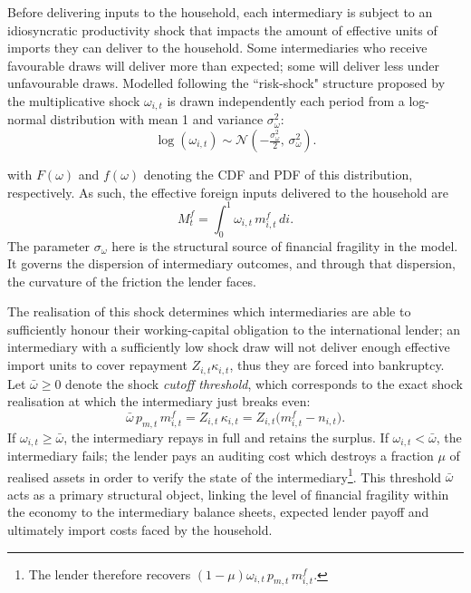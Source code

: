 \documentclass[11pt]{article}
\theoremstyle{definition}
\theoremstyle{plain}
\theoremstyle{remark}
\newcommand{\mf}{m^{f}}
\newcommand{\Mf}{M^{f}}
\begin{document}
Before delivering inputs to the household, each intermediary is subject to an idiosyncratic productivity shock that impacts the amount of effective units of imports they can deliver to the household. Some intermediaries who receive favourable draws will deliver more than expected; some will deliver less under unfavourable draws. Modelled following the ``risk-shock" structure proposed by \citet{christiano_risk_2014} the multiplicative shock $\omega_{i,t}$ is drawn independently each period from a log-normal distribution with mean 1 and variance $\sigma_\omega^2$:
\begin{equation}\label{eq:omega_dist}
\log(\omega_{i,t}) \sim \mathcal{N}\!\left(-\tfrac{\sigma_\omega^2}{2},\, \sigma_\omega^2\right).
\end{equation}

with $F(\omega)$ and $f(\omega)$ denoting the CDF and PDF of this distribution, respectively. As such, the effective foreign inputs delivered to the household are
\begin{equation}\label{eq:agg_supply}
\Mf_t = \int_0^1 \omega_{i,t}\,\mf_{i,t}\,di.
\end{equation}
The parameter $\sigma_\omega$ here is the structural source of financial fragility in the model. It governs the dispersion of intermediary outcomes, and through that dispersion, the curvature of the friction the lender faces. 

The realisation of this shock determines which intermediaries are able to sufficiently honour their working-capital obligation to the international lender; an intermediary with a sufficiently low shock draw will not deliver enough effective import units to cover repayment $Z_{i,t}\kappa_{i,t}$, thus they are forced into bankruptcy. Let $\bar{\omega}\geq 0$ denote the shock \textit{cutoff threshold}, which corresponds to the exact shock realisation at which the intermediary just breaks even:
\begin{equation}\label{eq:threshold}
\bar{\omega}\, p_{m,t}\, \mf_{i,t} = Z_{i,t}\,\kappa_{i,t} = Z_{i,t}\bigl( \mf_{i,t} - n_{i,t}\bigr).
\end{equation}
If $\omega_{i,t} \geq \bar{\omega}$, the intermediary repays in full and retains the surplus. If $\omega_{i,t} < \bar{\omega}$, the intermediary fails; the lender pays an auditing cost which destroys a fraction $\mu$ of realised assets in order to verify the state of the intermediary\footnote{The lender therefore recovers $(1-\mu)\omega_{i,t}\,p_{m,t}\,\mf_{i,t}$.}. This threshold $\bar \omega$ acts as a primary structural object, linking the level of financial fragility within the economy to the intermediary balance sheets, expected lender payoff and ultimately import costs faced by the household. 
\end{document}
